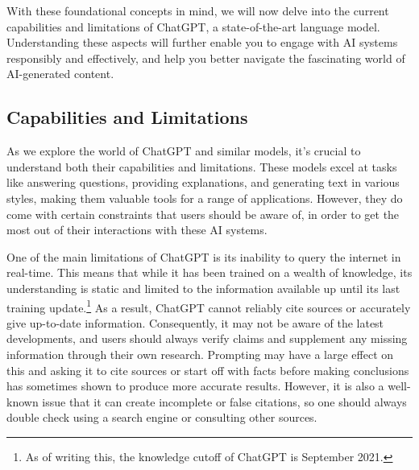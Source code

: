 \documentclass[12pt]{article}
\begin{document}



With these foundational concepts in mind, we will now delve into the current capabilities and limitations of ChatGPT, a state-of-the-art language model. Understanding these aspects will further enable you to engage with AI systems responsibly and effectively, and help you better navigate the fascinating world of AI-generated content.


\subsection{Capabilities and Limitations}\label{sec:capabilities}
As we explore the world of ChatGPT and similar models, it's crucial to understand both their capabilities and limitations. These models excel at tasks like answering questions, providing explanations, and generating text in various styles, making them valuable tools for a range of applications. However, they do come with certain constraints that users should be aware of, in order to get the most out of their interactions with these AI systems.

One of the main limitations of ChatGPT is its inability to query the internet in real-time. This means that while it has been trained on a wealth of knowledge, its understanding is static and limited to the information available up until its last training update.\footnote{As of writing this, the knowledge cutoff of ChatGPT is September 2021.} As a result, ChatGPT cannot reliably cite sources or accurately give up-to-date information. Consequently, it may not be aware of the latest developments, and users should always verify claims and supplement any missing information through their own research. 
Prompting may have a large effect on this and asking it to cite sources or start off with facts before making conclusions has sometimes shown to produce more accurate results. However, it is also a well-known issue that it can create incomplete or false citations, so one should always double check using a search engine or consulting other sources.
\end{document}
